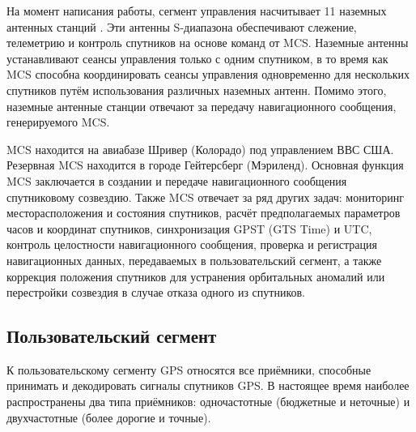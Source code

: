 На момент написания работы, сегмент управления насчитывает 11 наземных антенных станций \cite{GPS}.
Эти антенны S-диапазона обеспечивают слежение, телеметрию и контроль спутников на основе команд от MCS. 
Наземные антенны устанавливают сеансы управления только с одним спутником, в то время как MCS способна координировать сеансы управления одновременно для нескольких спутников путём использования различных наземных антенн.
Помимо этого, наземные антенные станции отвечают за передачу навигационного сообщения, генерируемого MCS.

MCS находится на авиабазе Шривер (Колорадо) под управлением ВВС США. 
Резервная MCS находится в городе Гейтерсберг (Мэриленд).
Основная функция MCS заключается в создании и передаче навигационного сообщения спутниковому созвездию.
Также MCS отвечает за ряд других задач: мониторинг месторасположения и состояния спутников, расчёт предполагаемых параметров часов и координат спутников, синхронизация GPST (GTS Time) и UTC, контроль целостности навигационного сообщения, проверка и регистрация навигационных данных, передаваемых в пользовательский сегмент, а также коррекция положения спутников для устранения орбитальных аномалий или перестройки созвездия в случае отказа одного из спутников. 

\subsection*{\textbf{Пользовательский сегмент}}

К пользовательскому сегменту GPS относятся все приёмники, способные принимать и декодировать сигналы спутников GPS.
В настоящее время наиболее распространены два типа приёмников: одночастотные (бюджетные и неточные) и двухчастотные (более дорогие и точные).